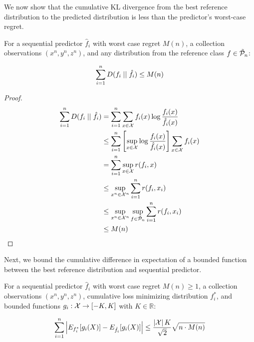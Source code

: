 We now show that the cumulative KL divergence from the best reference distribution to the predicted distribution is less than the predictor's worst-case regret.

\begin{lemma}\label{lemma:kl}
For a sequential predictor $\hat{f}_i$ with worst case regret $M(n)$, a collection observations $(x^n,y^n,z^n)$, and any distribution from the reference class $f \in \tilde{\mathcal{P}}_n$:

\begin{equation}
\sum_{i=1}^n D(f_i \mid \mid \hat{f}_i)\le M(n)
\end{equation}
\end{lemma}

\begin{proof}
\begin{align}
\sum_{i=1}^n D(f_i \mid \mid \hat{f}_i)
&= \sum_{i=1}^n \sum_{x\in\mathcal{X}} f_i(x)
    \log \frac{f_i(x)}{\hat{f}_i(x)} \\
&\le \sum_{i=1}^n
    \left[ \sup_{x\in\mathcal{X}}
    \log \frac{f_i(x)}{\hat{f}_i(x)} \right]
    \sum_{x\in\mathcal{X}} f_i(x) \\
&= \sum_{i=1}^n \sup_{x\in\mathcal{X}} r(f_i,x) \\
&\le \sup_{x^n\in\mathcal{X}^n} \sum_{i=1}^n r(f_i,x_i)\\
&\le \sup_{x^n\in\mathcal{X}^n} \sup_{f\in\tilde{\mathcal{P}}_n} \sum_{i=1}^n r(f_i,x_i)\\
&\le M(n)
\end{align}
\end{proof}

Next, we bound the cumulative difference in expectation of a bounded function between the best reference distribution and sequential predictor.

\begin{lemma}
For a sequential predictor $\hat{f}_i$ with worst case regret $M(n)\ge 1$, a collection observations $(x^n,y^n,z^n)$, cumulative loss minimizing distribution $f^*_i$, and bounded functions $g_i:\mathcal{X}\rightarrow [-K,K]$ with $K\in\mathbb{R}$:

\begin{equation}
\sum_{i=1}^n \left| E_{f^*_i}[g_i(X)] -
    E_{\hat{f}_i}[g_i(X)] \right| \le
    \frac{\left|\mathcal{X}\right|K}{\sqrt{2}}\sqrt{n \cdot M(n)}
\end{equation}
\end{lemma}


